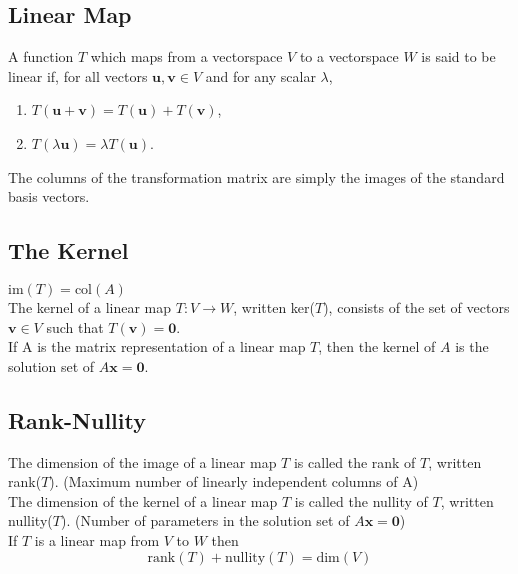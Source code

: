 \documentclass[a4paper,10pt]{article}
\begin{document}
\subsection*{Linear Map}
A function $T$ which maps from a vectorspace $V$ to a vectorspace $W$ is said to be linear if, for all vectors $\mathbf{u}, \mathbf{v} \in V$ and for any scalar $\lambda$,
\begin{enumerate}
\renewcommand{\labelenumi}{\roman{enumi})}
\item $T(\mathbf{u} + \mathbf{v}) = T(\mathbf{u}) + T(\mathbf{v})$,
\item $T(\lambda\mathbf{u}) = \lambda T(\mathbf{u})$.
\end{enumerate}

The columns of the transformation matrix are simply the images of the standard basis vectors.

\subsection*{The Kernel}
$\mbox{im}(T) = \mbox{col}(A)$\\
The kernel of a linear map $T : V \to W$, written ker($T$), consists of the set of vectors $\mathbf{v} \in V$ such that $T(\mathbf{v}) = \mathbf{0}$.\\
If A is the matrix representation of a linear map $T$, then the kernel of $A$ is the solution set of $A\mathbf{x} = \mathbf{0}$.

\subsection*{Rank-Nullity}
The dimension of the image of a linear map $T$ is called the rank of $T$, written rank($T$). (Maximum number of linearly independent columns of A)\\

The dimension of the kernel of a linear map $T$ is called the nullity of $T$, written nullity($T$). (Number of parameters in the solution set of $A\mathbf{x}=\mathbf{0}$)\\

If $T$ is a linear map from $V$ to $W$ then
$$\mbox{rank}(T) + \mbox{nullity}(T) = \mbox{dim}(V)$$
\end{document}
